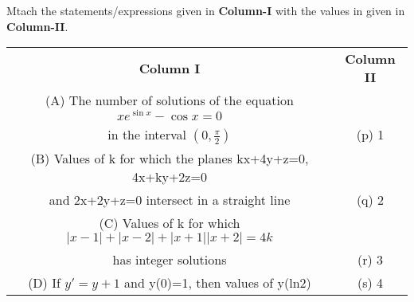 \clearpage
\item Mtach the statements/expressions given in \textbf{Column-I} with the values in given in \textbf{Column-II}.
\begin{table}[ht!]
\centering
\begin{tabular}{c c} 
 \textbf{Column I} & \textbf{Column II}\\ [0.5ex] 
 (A) The number of solutions of the equation
     $xe^{\sin x}-\cos x=0$\\
     in the interval $(0, \frac{\pi}{2})$                   &(p) 1\\ 
 (B) Values of k for which the planes
      kx+4y+z=0, 4x+ky+2z=0\\ and 2x+2y+z=0
      intersect in a straight line                          &(q) 2\\
 (C) Values of k for which
     $|x-1|+|x-2|+|x+1||x+2|=4k$\\
     has integer solutions                                  &(r) 3\\
 (D) If $y'=y+1$ and y(0)=1,
     then values of y(ln2)                                  &(s) 4\\[1ex]
                                                            
\end{tabular}
\end{table}

